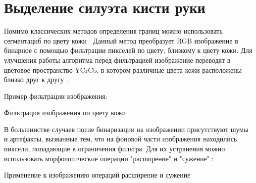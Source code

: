 \section{Выделение силуэта кисти руки}
\label{sec:Threholding}

Помимо классических методов определения границ можно использовать сегментациб по цвету кожи \cite{Phung}. Данный метод преобразует RGB изображение в бинарное с помощью фильтрации пикселей по цвету, близкому к цвету кожи. Для улучшения работы алгоритма перед фильтрацией изображение переводят в цветовое пространство YCrCb, в котором различные цвета кожи  расположены близко друг к другу \cite{Siddharth}.

Пример фильтрации изображения: 

\begin{minipage}{0.75\textwidth}
	\begin{algorithm}[H]
		
		\caption{Фильтрация изображения по цвету кожи}
		\label{imp:color-filter}
	\end{algorithm}
\end{minipage}

В большинстве случаев после бинаризации на изображении присутствуют шумы и артефакты, вызванные тем, что на фоновой части изображения находились пиксели, попадающие в ограничения фильтра. Для их устранения можно использовать морфологические операции "расширение" и "сужение" \cite{DIP}:

\begin{minipage}{0.75\textwidth}
	\begin{algorithm}[H]
		
		\caption{Применение к изображению операций расширение и сужение}
		\label{imp:color-noise}
	\end{algorithm}
\end{minipage}